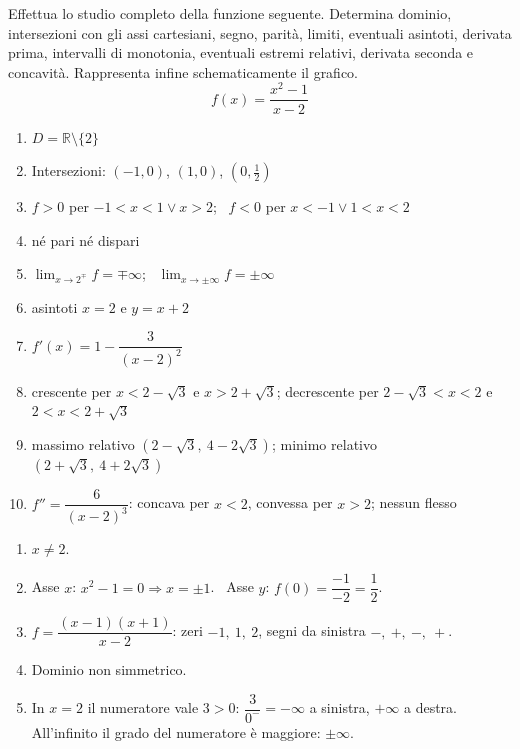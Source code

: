 \begin{question}[ID=2.3, subtitle={Studio completo di una funzione razionale fratta}, difficulty=media, tags={funzioni, studio di funzione, funzioni razionali}]
Effettua lo studio completo della funzione seguente. Determina dominio, intersezioni con gli assi cartesiani, segno, parità, limiti, eventuali asintoti, derivata prima, intervalli di monotonia, eventuali estremi relativi, derivata seconda e concavità. Rappresenta infine schematicamente il grafico.
\begin{equation*}
    f(x)=\dfrac{x^2-1}{x-2}
\end{equation*}
\begin{solution}
\begin{enumerate}
    \item $D=\mathbb{R}\setminus\{2\}$
    \item Intersezioni: $(-1,0)$, $(1,0)$, $\left(0,\tfrac12\right)$
    \item $f>0$ per $-1<x<1\vee x>2$; \ $f<0$ per $x<-1\vee1<x<2$
    \item né pari né dispari
    \item $\lim_{x\to2^\mp}f=\mp\infty$; \ $\lim_{x\to\pm\infty}f=\pm\infty$
    \item asintoti $x=2$ e $y=x+2$
    \item $f'(x)=1-\dfrac{3}{(x-2)^2}$
    \item crescente per $x<2-\sqrt3$ e $x>2+\sqrt3$; decrescente per $2-\sqrt3<x<2$ e $2<x<2+\sqrt3$
    \item massimo relativo $(2-\sqrt3,\ 4-2\sqrt3)$; minimo relativo $(2+\sqrt3,\ 4+2\sqrt3)$
    \item $f''=\dfrac{6}{(x-2)^3}$: concava per $x<2$, convessa per $x>2$; nessun flesso
\end{enumerate}
\end{solution}
\begin{explanation}
\begin{enumerate}
    \item $x\neq2$.
    \item Asse $x$: $x^2-1=0 \Rightarrow x=\pm1$. \ Asse $y$: $f(0)=\dfrac{-1}{-2}=\dfrac12$.
    \item $f=\dfrac{(x-1)(x+1)}{x-2}$: zeri $-1,\ 1,\ 2$, segni da sinistra $-,\ +,\ -,\ +$.
    \item Dominio non simmetrico.
    \item In $x=2$ il numeratore vale $3>0$: $\dfrac{3}{0^-}=-\infty$ a sinistra, $+\infty$ a destra. All'infinito il grado del numeratore è maggiore: $\pm\infty$.

\end{enumerate}
\end{explanation}
\end{question}

